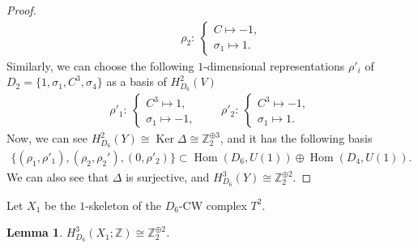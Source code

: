 \documentclass[11pt]{article}
\newtheorem{lem}[thm]{Lemma}
\theoremstyle{definition}
\newcommand{\Z}{\mathbb{Z}}
\begin{document}
\begin{proof}
\begin{gather*}
\qquad
\rho_2 \colon \
\begin{cases}
C \mapsto -1, \\
\sigma_1 \mapsto 1.
\end{cases}
\end{gather*}
Similarly, we can choose the following $1$-dimensional representations $\rho'_i$ of $D_2 = \{ 1, \sigma_1, C^3, \sigma_4 \}$ as a basis of $H^2_{D_6}(V)$
\begin{gather*}
\rho'_1 \colon \
\begin{cases}
C^3 \mapsto 1, \\
\sigma_1 \mapsto -1,
\end{cases}
\qquad
\rho'_2 \colon \
\begin{cases}
C^3 \mapsto -1, \\
\sigma_1 \mapsto 1.
\end{cases}
\end{gather*}
Now, we can see $H^2_{D_6}(Y) \cong \operatorname{Ker}\Delta \cong \Z_2^{\oplus 3}$, and it has the following basis
\begin{gather*}
\{ (\rho_1, \rho'_1), (\rho_2, \rho_2'), (0, \rho'_2) \} \subset \operatorname{Hom}(D_6, U(1)) \oplus \operatorname{Hom}(D_4, U(1)).
\end{gather*}
We can also see that $\Delta$ is surjective, and $H^3_{D_6}(Y) \cong \Z_2^{\oplus 2}$.
\end{proof}

Let $X_1$ be the $1$-skeleton of the $D_6$-CW complex $T^2$.

\begin{lem}
$H^3_{D_6}(X_1; \Z) \cong \Z_2^{\oplus 2}$.
\end{lem}
\end{document}

